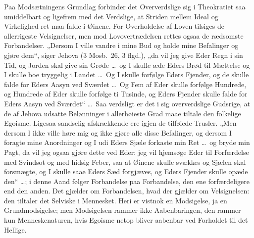 \documentclass[12pt]{book}
\begin{document}
Paa Modsætningens Grundlag forbinder det Oververdslige sig i
Theokratiet saa umiddelbart og ligefrem med det Verdslige, at
Striden mellem Ideal og Virkelighed ret maa falde i Øinene. For
Overholdelse af Loven tilsiges de allerrigeste Velsignelser, men mod
Lovovertrædelsen rettes ogsaa de rædsomste Forbandelser. „Dersom I
ville vandre i mine Bud og holde mine Befalinger
og gjøre dem“, siger Jehova (3 Mosb.\ 26, 3 flgd.), „da vil jeg give
Eder Regn i sin Tid, og Jorden skal give sin Grøde \dots\ og I
skulle æde Eders Brød til Mættelse og I skulle boe tryggelig i
Landet \dots\ Og I skulle forfølge Eders Fjender, og de skulle falde
for Eders Aasyn ved Sværdet \dots\ Og Fem af Eder skulle forfølge
Hundrede, og Hundrede af Eder skulle forfølge ti Tusinde, og Eders
Fjender skulle falde for Eders Aasyn ved Sværdet“ \dots\ Saa
verdsligt er det i sig oververdslige Gudsrige, at de af Jehova
udsatte Belønninger i allerhøieste Grad maae tiltale den folkelige
Egoisme. Ligesaa sandselig afskrækkende ere igjen de tilføiede
Trusler. „Men dersom I ikke ville høre mig og ikke gjøre alle disse
Befalinger, og dersom I foragte mine Anordninger og I udi Eders
Sjæle forkaste min Ret \dots\ og bryde min Pagt, da vil jeg ogsaa
gjøre dette ved Eder: jeg vil hjemsøge Eder til Forfærdelse med
Svindsot og med hidsig Feber, saa at Øinene skulle svækkes og Sjælen
skal forsmægte, og I skulle saae Eders Sæd forgjæves, og Eders
Fjender skulle opæde den“ \dots; i denne Aand følger Forbandelse paa
Forbandelse, den ene forfærdeligere end den anden. Det gjælder om
Forbandelsen, hvad der gjælder om Velsignelsen: den tiltaler det
Selviske i Mennesket. Heri er vistnok en Modsigelse, ja en
Grundmodsigelse; men Modsigelsen rammer ikke Aabenbaringen, den
rammer kun Menneskenaturen, hvis Egoisme netop bliver aabenbar ved
Forholdet til det Hellige.
\end{document}
